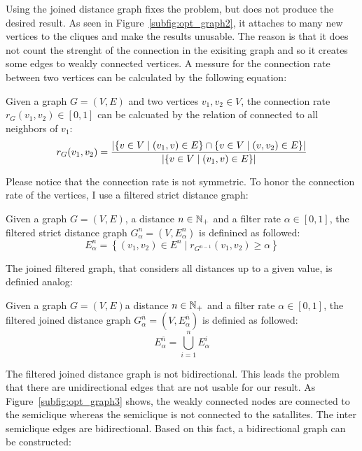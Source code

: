 Using the joined distance graph fixes the problem, but does not produce the desired result. As seen in Figure~\ref{subfig:opt_graph2}, it attaches to many new vertices to the cliques and make the results unusable. The reason is that it does not count the strenght of the connection in the exisiting graph and so it creates some edges to weakly connected vertices. A messure for the connection rate between two vertices can be calculated by the following equation:
\begin{envdef}
	Given a graph $G=(V,E)$ and two vertices $v_1,v_2 \in V$, the connection rate $r_G(v_1,v_2) \in \left[0,1\right]$ can be calcuated by the relation of connected to all neighbors of $v_1$:
	\begin{equation}
		r_G(v_1,v_2) = \frac{
			\left| \left\{ v \in V \mid (v_1, v) \in E \right\} \cap \left\{ v \in V \mid (v,v_2) \in E \right\} \right|
		}{
			\left| \left\{ v \in V \mid (v_1, v) \in E \right\} \right|
		}
	\end{equation}
\end{envdef}
Please notice that the connection rate is not symmetric. To honor the connection rate of the vertices, I use a filtered strict distance graph:
\begin{envdef}
	Given a graph $G=(V,E)$, a distance $n \in \mathbb{N}_+$ and a filter rate $\alpha \in \left[0,1\right]$, the filtered strict distance graph $G_\alpha^n=(V,E_\alpha^n)$ is definined as followed:
	\begin{equation}
		E_\alpha^n = \left\{ (v_1,v_2) \in E^n \mid r_{G^{n-1}}(v_1,v_2) \geq \alpha \right\}
	\end{equation}
\end{envdef}
The joined filtered graph, that considers all distances up to a given value, is definied analog:
\begin{envdef}
	Given a graph $G=(V,E)$a distance $n \in \mathbb{N}_+$ and a filter rate $\alpha \in \left[0,1\right]$, the filtered joined distance graph $G_\alpha^{\overline{n}}=(V,E_\alpha^{\overline{n}})$ is definied as followed:
	\begin{equation}
		E_\alpha^{\overline{n}} = \bigcup_{i=1}^n E_\alpha^i
	\end{equation}
\end{envdef}
The filtered joined distance graph is not bidirectional. This leads the problem that there are unidirectional edges that are not usable for our result. As Figure~\ref{subfig:opt_graph3} shows, the weakly connected nodes are connected to the semiclique whereas the semiclique is not connected to the satallites. The inter semiclique edges are bidirectional. Based on this fact, a bidirectional graph can be constructed:
